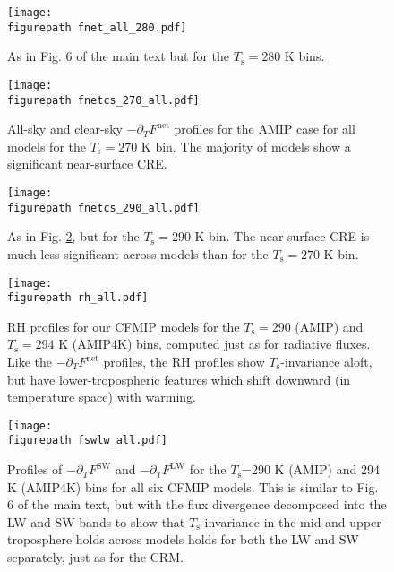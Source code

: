 \documentclass[11pt]{article}
\newcommand{\ppt}{\ensuremath{\partial_T}}
\newcommand{\FLW}{\ensuremath{F^\mathrm{LW}}}
\newcommand{\FSW}{\ensuremath{F^\mathrm{SW}}}
\newcommand{\Fnet}{\ensuremath{F^\mathrm{net}}}
\newcommand{\Ts}{\ensuremath{T_\mathrm{s}}}
\newcommand{\figurepath}{../../../figures/}
\begin{document}
\begin{figure}[h]
        \begin{center}
                        \texttt{[image: \\figurepath fnet\_all\_280.pdf]}
                \caption{As in Fig. 6 of the main text but for the $\Ts=280$ K bins.
                                \label{fnet_all_280}
                }
        \end{center}
\end{figure}


\begin{figure}[h]
        \begin{center}
                        \texttt{[image: \\figurepath fnetcs\_270\_all.pdf]}
                \caption{All-sky and clear-sky $-\ppt\Fnet$ profiles for the AMIP case for all models for the $\Ts=270$ K bin. The majority of models show a significant near-surface CRE.
                                \label{fnetcs_270_all}
                }
        \end{center}
\end{figure}

\begin{figure}[h]
        \begin{center}
                        \texttt{[image: \\figurepath fnetcs\_290\_all.pdf]}
                \caption{As in Fig. \ref{fnetcs_270_all},  but for the $\Ts= 290$ K bin. The near-surface CRE is much less significant across models than for the $\Ts= 270$ K bin.
                                \label{fnetcs_290_all}
                }
        \end{center}
\end{figure}

\begin{figure}[h]
        \begin{center}
                        \texttt{[image: \\figurepath rh\_all.pdf]}
                \caption{RH profiles for our CFMIP models for the $\Ts=290$ (AMIP) and  $\Ts= 294$ K (AMIP4K) bins, computed just as for radiative fluxes. Like the $-\ppt\Fnet$ profiles, the RH profiles show \Ts-invariance aloft, but have lower-tropospheric features which shift downward (in temperature space) with warming.
                                \label{rh_all}
                }
        \end{center}
\end{figure}

\begin{figure}[h!]
	\begin{center}
			\texttt{[image: \\figurepath fswlw\_all.pdf]}
		\caption{ Profiles of $-\ppt \FSW$ and $-\ppt \FLW$ for the \Ts=290 K (AMIP) and 294 K (AMIP4K) bins for all six CFMIP models. This is similar to Fig. 6 of the main text, but with the flux divergence decomposed into the LW and SW bands to show  that \Ts-invariance in the mid and upper troposphere holds across models holds for both the LW and SW separately, just as for the CRM. 
		\label{fswlw_all}
		}
	\end{center}
\end{figure}
\end{document}
